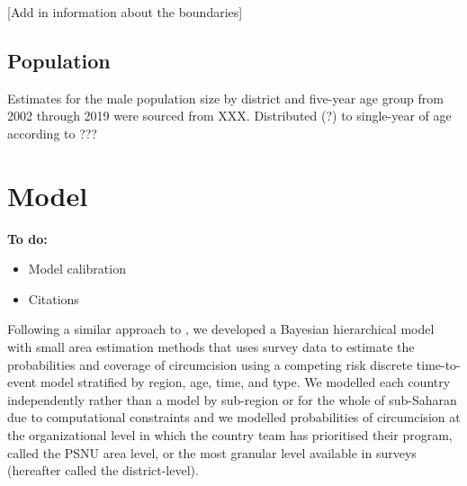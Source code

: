 \documentclass{article}
\begin{document}
\begin{appendix}

[Add in information about the boundaries] 


\subsection{Population}
\label{sec:org0d7d6e9}


Estimates for the male population size by district and five-year age group from 2002 through 2019 were sourced from XXX. 
Distributed (?) to single-year of age according to ??? 


\section{Model}
\label{sec:org38d457a}


{\color{red} \bf
To do:
\begin{itemize}
    \item Model calibration
    \item Citations
\end{itemize}}

Following a similar approach to \cite{thomas2021multilevel}, we developed a Bayesian hierarchical model with small area estimation methods that uses survey data to estimate the probabilities and coverage of circumcision using a competing risk discrete time-to-event model stratified by region, age, time, and type. We modelled each country independently rather than a model by sub-region or for the whole of sub-Saharan due to computational constraints and we modelled probabilities of circumcision at the organizational level in which the country team has prioritised their program, called the PSNU area level, or the most granular level available in surveys (hereafter called the district-level). 


\end{appendix}
\end{document}
